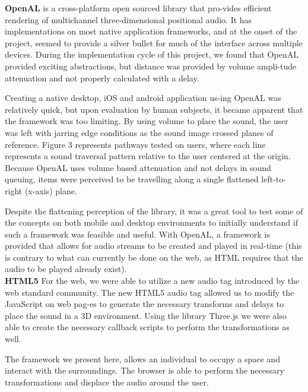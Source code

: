 \textbf{OpenAL} is a cross-platform open sourced library that pro-vides
efficient rendering of multichannel three-dimensional positional audio.  It has
implementations on most native  application frameworks, and at the onset of the
project, seemed to provide a silver bullet for much of the interface across
multiple devices.  During the implementation cycle of this project, we found
that OpenAL provided exciting abstractions, but distance was provided by volume
ampli-tude attenuation and not properly calculated with a delay.

Creating a native desktop, iOS and android application us-ing OpenAL was
relatively quick, but upon evaluation by  human subjects, it became apparent
that the framework was too limiting.  By using volume to place the sound, the
user was left with jarring edge conditions as the sound image crossed planes of
reference.  Figure 3 represents pathways tested on users, where each line
represents a sound traversal pattern relative to the user centered at the
origin. Because OpenAL uses volume based attenuation and not delays in sound
queuing, items were perceived to be travelling along a single flattened left-to-
right (x-axis) plane.

Despite the flattening perception of the library, it was a great tool to test
some of the concepts on both mobile and desktop environments to initially
understand if such a framework was feasible and useful.  With OpenAL, a
framework is provided that allows for audio streams to be created and played in
real-time (this is contrary to what can currently be done on the web, as HTML
requires that the audio to be played already exist).\\


\textbf{HTML5} For the web, we were able to utilize a new audio tag introduced
by the web standard community.  The new HTML5 audio tag allowed us to modify
the JavaScript on web pag-es to generate the necessary transforms and delays to
place the sound in a 3D environment.  Using the library Three.js we were also
able to create the necessary callback scripts to perform the transformations as
well.

The framework we present here, allows an individual to occupy a space and
interact with the surroundings.  The browser is able to perform the necessary
transformations and displace the audio around the user.
